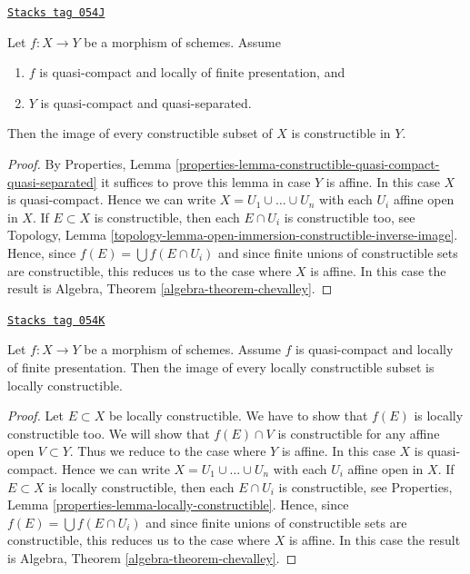 \begin{lemma}[Chevalley]
\label{morphisms-lemma-chevalley}
\href{https://stacks.math.columbia.edu/tag/054J}{\texttt{Stacks tag 054J}}

Let $f : X \to Y$ be a morphism of schemes.
Assume
\begin{enumerate}
\item $f$ is quasi-compact and locally of finite presentation, and
\item $Y$ is quasi-compact and quasi-separated.
\end{enumerate}
Then the image of every constructible subset of $X$ is constructible in $Y$.
\end{lemma}

\begin{proof}
By
Properties,
Lemma \ref{properties-lemma-constructible-quasi-compact-quasi-separated}
it suffices to prove this lemma in case $Y$ is affine.
In this case $X$ is quasi-compact. Hence we can write
$X = U_1 \cup \ldots \cup U_n$ with each $U_i$ affine open in $X$.
If $E \subset X$ is constructible, then each $E \cap U_i$ is constructible
too, see
Topology,
Lemma \ref{topology-lemma-open-immersion-constructible-inverse-image}.
Hence, since $f(E) = \bigcup f(E \cap U_i)$ and since finite unions of
constructible sets are constructible, this reduces us to the case where
$X$ is affine. In this case the result is
Algebra, Theorem \ref{algebra-theorem-chevalley}.
\end{proof}

\begin{theorem}

\label{morphisms-theorem-chevalley}
\href{https://stacks.math.columbia.edu/tag/054K}{\texttt{Stacks tag 054K}}

\begin{reference}
\cite[IV, Theorem 1.8.4]{EGA}
\end{reference}
Let $f : X \to Y$ be a morphism of schemes.
Assume $f$ is quasi-compact and locally of finite presentation.
Then the image of every locally constructible subset is locally constructible.
\end{theorem}

\begin{proof}
Let $E \subset X$ be locally constructible.
We have to show that $f(E)$ is locally constructible too.
We will show that $f(E) \cap V$ is constructible for any affine
open $V \subset Y$. Thus we reduce to the case where $Y$ is affine.
In this case $X$ is quasi-compact. Hence we can write
$X = U_1 \cup \ldots \cup U_n$ with each $U_i$ affine open in $X$.
If $E \subset X$ is locally constructible, then each $E \cap U_i$
is constructible, see
Properties, Lemma \ref{properties-lemma-locally-constructible}.
Hence, since $f(E) = \bigcup f(E \cap U_i)$ and since finite unions of
constructible sets are constructible, this reduces us to the case where $X$
is affine. In this case the result is
Algebra, Theorem \ref{algebra-theorem-chevalley}.
\end{proof}


